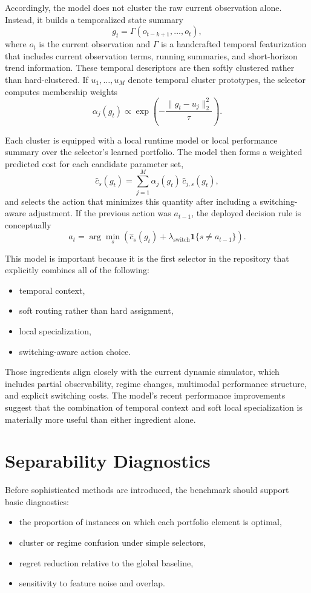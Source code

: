 \documentclass[11pt]{report}
\begin{document}
Accordingly, the model does not cluster the raw current observation alone. Instead, it builds a temporalized state summary
\[
g_t = \Gamma(o_{t-k+1}, \dots, o_t),
\]
where $o_t$ is the current observation and $\Gamma$ is a handcrafted temporal featurization that includes current observation terms, running summaries, and short-horizon trend information. These temporal descriptors are then softly clustered rather than hard-clustered. If $u_1,\dots,u_M$ denote temporal cluster prototypes, the selector computes membership weights
\[
\alpha_j(g_t) \propto \exp\!\left(-\frac{\lVert g_t - u_j\rVert_2^2}{\tau}\right).
\]

Each cluster is equipped with a local runtime model or local performance summary over the selector's learned portfolio. The model then forms a weighted predicted cost for each candidate parameter set,
\[
\hat{c}_s(g_t) = \sum_{j=1}^M \alpha_j(g_t)\,\hat{c}_{j,s}(g_t),
\]
and selects the action that minimizes this quantity after including a switching-aware adjustment. If the previous action was $a_{t-1}$, the deployed decision rule is conceptually
\[
a_t =
\arg\min_s
\left(
\hat{c}_s(g_t) + \lambda_{\mathrm{switch}}\mathbf{1}\{s \neq a_{t-1}\}
\right).
\]

This model is important because it is the first selector in the repository that explicitly combines all of the following:
\begin{itemize}[leftmargin=2em]
\item temporal context,
\item soft routing rather than hard assignment,
\item local specialization,
\item switching-aware action choice.
\end{itemize}

Those ingredients align closely with the current dynamic simulator, which includes partial observability, regime changes, multimodal performance structure, and explicit switching costs. The model's recent performance improvements suggest that the combination of temporal context and soft local specialization is materially more useful than either ingredient alone.

\section{Separability Diagnostics}

Before sophisticated methods are introduced, the benchmark should support basic diagnostics:
\begin{itemize}[leftmargin=2em]
\item the proportion of instances on which each portfolio element is optimal,
\item cluster or regime confusion under simple selectors,
\item regret reduction relative to the global baseline,
\item sensitivity to feature noise and overlap.
\end{itemize}
\end{document}
